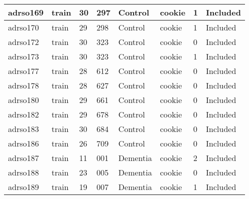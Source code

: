 \begin{center}
\begin{longtable}{|l|l|l|l|l|l|l|l|}
adrso169       & train                 & 30              & 297                & Control              & cookie          & 1                & Included      \\ \hline
adrso170       & train                 & 29              & 298                & Control              & cookie          & 1                & Included      \\ \hline
adrso172       & train                 & 30              & 323                & Control              & cookie          & 0                & Included      \\ \hline
adrso173       & train                 & 30              & 323                & Control              & cookie          & 1                & Included      \\ \hline
adrso177       & train                 & 28              & 612                & Control              & cookie          & 0                & Included      \\ \hline
adrso178       & train                 & 28              & 627                & Control              & cookie          & 0                & Included      \\ \hline
adrso180       & train                 & 29              & 661                & Control              & cookie          & 0                & Included      \\ \hline
adrso182       & train                 & 29              & 678                & Control              & cookie          & 0                & Included      \\ \hline
adrso183       & train                 & 30              & 684                & Control              & cookie          & 0                & Included      \\ \hline
adrso186       & train                 & 26              & 709                & Control              & cookie          & 0                & Included      \\ \hline
adrso187       & train                 & 11              & 001                & Dementia             & cookie          & 2                & Included      \\ \hline
adrso188       & train                 & 23              & 005                & Dementia             & cookie          & 0                & Included      \\ \hline
adrso189       & train                 & 19              & 007                & Dementia             & cookie          & 1                & Included      \\ \hline

\end{longtable}
\end{center}
